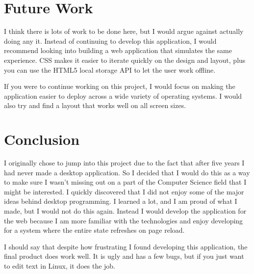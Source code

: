 \documentclass[10pt]{article}
\begin{document}
\section{Future Work}

I think there is lots of work to be done here, but I would argue against actually doing any it. Instead of continuing to develop this application, I would recommend looking into building a web application that simulates the same experience. CSS makes it easier to iterate quickly on the design and layout, plus you can use the HTML5 local storage API to let the user work offline.

If you were to continue working on this project, I would focus on making the application easier to deploy across a wide variety of operating systems. I would also try and find a layout that works well on all screen sizes.

\section{Conclusion}

I originally chose to jump into this project due to the fact that after five years I had never made a desktop application. So I decided that I would do this as a way to make sure I wasn't missing out on a part of the Computer Science field that I might be interested. I quickly discovered that I did not enjoy some of the major ideas behind desktop programming. I learned a lot, and I am proud of what I made, but I would not do this again. Instead I would develop the application for the web because I am more familiar with the technologies and enjoy developing for a system where the entire state refreshes on page reload.

I should say that despite how frustrating I found developing this application, the final product does work well. It is ugly and has a few bugs, but if you just want to edit text in Linux, it does the job.

\newpage
\singlespacing
{}
\nocite{*}


\end{document}
